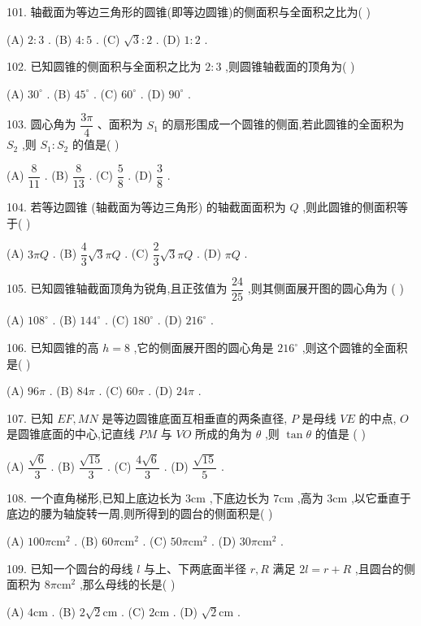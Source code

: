 101. 轴截面为等边三角形的圆锥(即等边圆锥)的侧面积与全面积之比为(   )

(A) $2 : 3$ . (B) $4 : 5$ . (C) $\sqrt{3} : 2$ . (D) $1 : 2$ .

102. 已知圆锥的侧面积与全面积之比为 $2 : 3$ ,则圆锥轴截面的顶角为(   )

(A) ${30}^{ \circ  }$ . (B) ${45}^{ \circ  }$ . (C) ${60}^{ \circ  }$ . (D) ${90}^{ \circ  }$ .

103. 圆心角为 $\dfrac{3\pi }{4}$ 、面积为 ${S}_{1}$ 的扇形围成一个圆锥的侧面,若此圆锥的全面积为 ${S}_{2}$ ,则 ${S}_{1} : {S}_{2}$ 的值是(   )

(A) $\dfrac{8}{11}$ . (B) $\dfrac{8}{13}$ . (C) $\dfrac{5}{8}$ . (D) $\dfrac{3}{8}$ .

104. 若等边圆锥 (轴截面为等边三角形) 的轴截面面积为 $Q$ ,则此圆锥的侧面积等于(   )

(A) ${3\pi Q}$ . (B) $\dfrac{4}{3}\sqrt{3}{\pi Q}$ . (C) $\dfrac{2}{3}\sqrt{3}{\pi Q}$ . (D) ${\pi Q}$ .

105. 已知圆锥轴截面顶角为锐角,且正弦值为 $\dfrac{24}{25}$ ,则其侧面展开图的圆心角为 (   )

(A) ${108}^{ \circ  }$ . (B) ${144}^{ \circ  }$ . (C) ${180}^{ \circ  }$ . (D) ${216}^{ \circ  }$ .

106. 已知圆锥的高 $h = 8$ ,它的侧面展开图的圆心角是 ${216}^{ \circ  }$ ,则这个圆锥的全面积是(   )

(A) ${96\pi }$ . (B) ${84\pi }$ . (C) ${60\pi }$ . (D) ${24\pi }$ .

107. 已知 ${EF},{MN}$ 是等边圆锥底面互相垂直的两条直径, $P$ 是母线 ${VE}$ 的中点, $O$ 是圆锥底面的中心,记直线 ${PM}$ 与 ${VO}$ 所成的角为 $\theta$ ,则 $\tan \theta$ 的值是 (   )

(A) $\dfrac{\sqrt{6}}{3}$ . (B) $\dfrac{\sqrt{15}}{3}$ . (C) $\dfrac{4\sqrt{6}}{3}$ . (D) $\dfrac{\sqrt{15}}{5}$ .

108. 一个直角梯形,已知上底边长为 $3\mathrm{{cm}}$ ,下底边长为 $7\mathrm{{cm}}$ ,高为 $3\mathrm{{cm}}$ ,以它垂直于底边的腰为轴旋转一周,则所得到的圆台的侧面积是(   )

(A) ${100\pi }{\mathrm{{cm}}}^{2}$ . (B) ${60\pi }{\mathrm{{cm}}}^{2}$ . (C) ${50\pi }{\mathrm{{cm}}}^{2}$ . (D) ${30\pi }{\mathrm{{cm}}}^{2}$ .

109. 已知一个圆台的母线 $l$ 与上、下两底面半径 $r,R$ 满足 ${2l} = r + R$ ,且圆台的侧面积为 ${8\pi }{\mathrm{{cm}}}^{2}$ ,那么母线的长是(   )

(A) $4\mathrm{{cm}}$ . (B) $2\sqrt{2}\mathrm{{cm}}$ . (C) $2\mathrm{{cm}}$ . (D) $\sqrt{2}\mathrm{{cm}}$ .

